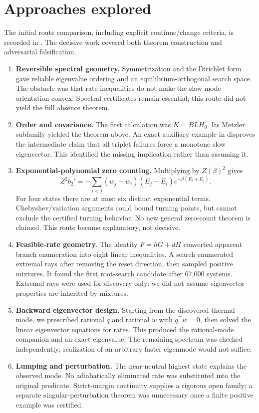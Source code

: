\documentclass[11pt]{article}
\begin{document}
\section{Approaches explored}
The initial route comparison, including explicit continue/change criteria, is recorded in . The decisive work covered both theorem construction and adversarial falsification.
\begin{enumerate}
\item \textbf{Reversible spectral geometry.} Symmetrization and the Dirichlet form gave reliable eigenvalue ordering and an equilibrium-orthogonal search space. The obstacle was that rate inequalities do not make the slow-mode orientation convex. Spectral certificates remain essential; this route did not yield the full absence theorem.
\item \textbf{Order and covariance.} The first calculation was $K=BLH_0$. Its Metzler subfamily yielded the theorem above. An exact auxiliary example in  disproves the intermediate claim that all triplet failures force a monotone slow eigenvector. This identified the missing implication rather than assuming it.
\item \textbf{Exponential-polynomial zero counting.} Multiplying by $Z(\beta)^2$ gives
\[
Z^2b_2'=-\sum_{i<j}(w_j-w_i)(E_j-E_i)e^{-\beta(E_i+E_j)}.
\]
For four states there are at most six distinct exponential terms. Chebyshev/variation arguments could bound turning points, but cannot exclude the certified turning behavior. No new general zero-count theorem is claimed. This route became explanatory, not decisive.
\item \textbf{Feasible-rate geometry.} The identity $F=hG+dH$ converted apparent branch enumeration into eight linear inequalities. A search enumerated extremal rays after removing the reset direction, then sampled positive mixtures. It found the first root-search candidate after 67,000 systems. Extremal rays were used for discovery only: we did not assume eigenvector properties are inherited by mixtures.
\item \textbf{Backward eigenvector design.} Starting from the discovered thermal mode, we prescribed rational $q$ and rational $w$ with $q^\top w=0$, then solved the linear eigenvector equations for rates. This produced the rational-mode companion and an exact eigenvalue. The remaining spectrum was checked independently; realization of an arbitrary faster eigenmode would not suffice.
\item \textbf{Lumping and perturbation.} The near-neutral highest state explains the observed mode. No adiabatically eliminated rate was substituted into the original predicate. Strict-margin continuity supplies a rigorous open family; a separate singular-perturbation theorem was unnecessary once a finite positive example was certified.

\end{enumerate}
\end{document}
